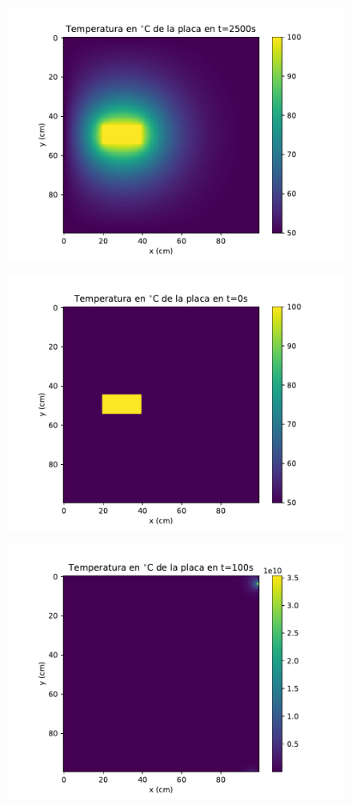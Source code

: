 \documentclass[12pt,letterpaper]{article}
\begin{document}
\begin{figure}[h]
\includegraphics{f2_2500.pdf}
\centering
\end{figure}

\begin{figure}[h]
\includegraphics{a1_0.pdf}
\centering
\end{figure}

\begin{figure}[h]
\includegraphics{a1_100.pdf}
\centering
\end{figure}
\end{document}

